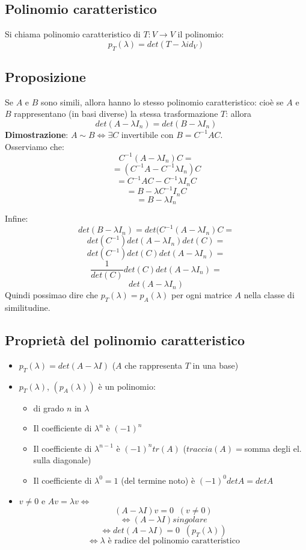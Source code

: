 \subsection{Polinomio caratteristico}
Si chiama polinomio caratteristico di $T:V\rightarrow V$ il polinomio:
\[p_T(\lambda)=det(T-\lambda id_V)\]

\subsection{Proposizione}
Se $A$ e $B$ sono simili, allora hanno lo stesso polinomio caratteristico: cioè se $A$ e $B$ rappresentano (in basi diverse) la stessa trasformazione $T$: allora
\[det(A-\lambda I_n)=det(B-\lambda I_n)\]
\textbf{Dimostrazione}: $A\sim B\Leftrightarrow \exists C$ invertibile con $B=C^{-1}AC$.
\\Osserviamo che:
\[C^{-1}(A-\lambda I_n)C=\]
\[=(C^{-1}A-C^{-1}\lambda I_n)C\]
\[=C^{-1}AC-C^{-1}\lambda I_nC\]
\[=B-\lambda C^{-1}I_n C\]
\[=B-\lambda I_n\]

Infine:
\[det(B-\lambda I_n)=det(C^{-1}(A-\lambda I_n)C=\]
\[det(C^{-1})det(A-\lambda I_n)det(C)=\]
\[det(C^{-1})det(C)det(A-\lambda I_n)=\]
\[\frac{1}{det(C)}det(C)det(A-\lambda I_n)=\]
\[det(A-\lambda I_n)\]
Quindi possimao dire che $p_T(\lambda)=p_A(\lambda)$ per ogni matrice $A$ nella classe di similitudine.

\subsection{Proprietà del polinomio caratteristico}
\begin{itemize}

\item $p_T(\lambda)=det(A-\lambda I)$ ($A$ che rappresenta $T$ in una base)

\item $p_T(\lambda)$, $(p_A(\lambda))$ è un polinomio:
  \begin{itemize}
  \item di grado $n$ in $\lambda $
  \item Il coefficiente di $\lambda ^n$ è $(-1)^n$
  \item Il coefficiente di $\lambda^{n-1}$ è $(-1)^ntr(A)$ ($traccia(A)=$somma degli el. sulla diagonale)
  \item Il coefficiente di $\lambda ^0=1$ (del termine noto) è $(-1)^0detA=detA$
  \end{itemize}

\item $v\neq 0$ e $Av=\lambda v \Leftrightarrow$
  \[(A-\lambda I)v=0\;\;(v\neq 0)\]
  \[\Leftrightarrow (A-\lambda I)singolare\]
  \[\Leftrightarrow det(A-\lambda I)=0\;\;(p_T(\lambda))\]
  \[\Leftrightarrow\lambda\text{ è radice del polinomio caratteristico}\]

\end{itemize}

